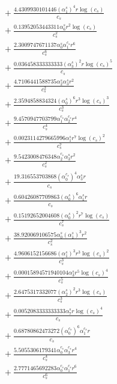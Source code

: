 \documentclass[10pt]{article}
\begin{document}
\begin{align*}
&{}  + \frac{4.4309930101446 \left(\alpha_{1}^s\right)^{4} r \log{\left(c_{s} \right)}}{c_{s}} \\
&{}  + \frac{0.13952053443311 \alpha_{6}^s r^{2} \log{\left(c_{s} \right)}}{c_{s}^{2}} \\
&{}  + \frac{2.3009747671137 \alpha_{0}^s \alpha_{1}^{c_s} r^{6}}{c_{s}^{6}} \\
&{}  + \frac{0.036458333333333 \left(\alpha_{3}^s\right)^{2} r \log{\left(c_{s} \right)}^{5}}{c_{s}} \\
&{}  + \frac{4.7106441588735 \alpha_{2}^s \alpha_{3}^s r^{2}}{c_{s}^{2}} \\
&{}  + \frac{2.3594858834324 \left(\alpha_{0}^s\right)^{6} r^{3} \log{\left(c_{s} \right)}^{3}}{c_{s}^{3}} \\
&{}  + \frac{9.4570947703799 \alpha_{1}^{c_s} \alpha_{2}^{c_s} r^{4}}{c_{s}^{4}} \\
&{}  + \frac{0.0023114279665996 \alpha_{1}^s r^{7} \log{\left(c_{s} \right)}^{2}}{c_{s}^{7}} \\
&{}  + \frac{9.5423008476348 \alpha_{2}^{c_s} \alpha_{3}^s r^{2}}{c_{s}^{2}} \\
&{}  + \frac{19.316553703868 \left(\alpha_{0}^{c_s}\right)^{4} \alpha_{3}^s r}{c_{s}} \\
&{}  + \frac{0.60426087709863 \left(\alpha_{0}^s\right)^{6} \alpha_{1}^s r}{c_{s}} \\
&{}  + \frac{0.15192652004608 \left(\alpha_{0}^s\right)^{2} r^{7} \log{\left(c_{s} \right)}}{c_{s}^{7}} \\
&{}  + \frac{38.920069106575 \alpha_{0}^s \left(\alpha_{1}^s\right)^{3} r^{2}}{c_{s}^{2}} \\
&{}  + \frac{4.9606152156686 \left(\alpha_{1}^s\right)^{3} r^{3} \log{\left(c_{s} \right)}^{2}}{c_{s}^{3}} \\
&{}  + \frac{0.00015894571940104 \alpha_{3}^s r^{5} \log{\left(c_{s} \right)}^{4}}{c_{s}^{5}} \\
&{}  + \frac{2.6475317332077 \left(\alpha_{2}^s\right)^{2} r^{3} \log{\left(c_{s} \right)}}{c_{s}^{3}} \\
&{}  + \frac{0.0052083333333333 \alpha_{7}^s r \log{\left(c_{s} \right)}^{4}}{c_{s}} \\
&{}  + \frac{0.68780862473272 \left(\alpha_{0}^{c_s}\right)^{6} \alpha_{1}^{c_s} r}{c_{s}} \\
&{}  + \frac{5.5055306179341 \alpha_{0}^{c_s} \alpha_{3}^{c_s} r^{4}}{c_{s}^{4}} \\
&{}  + \frac{2.7771465692283 \alpha_{0}^{c_s} \alpha_{1}^{c_s} r^{6}}{c_{s}^{6}} \\

\end{align*}
\end{document}
